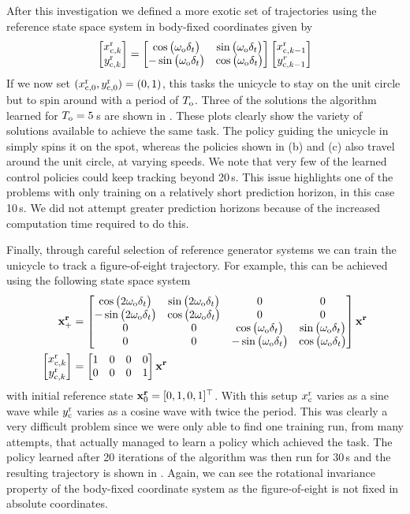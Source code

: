 After this investigation we defined a more exotic set of trajectories using the reference state space system in body-fixed coordinates given by
\begin{equation*}
\begin{bmatrix} x^{\text{r}}_{\text{c},k} \\ y^{\text{r}}_{\text{c},k} \end{bmatrix} = \begin{bmatrix}  \cos\big(\omega_{\text{o}} \delta_t\big) & \sin\big(\omega_{\text{o}} \delta_t\big) \\ -\sin\big(\omega_{\text{o}} \delta_t\big) & \cos\big(\omega_{\text{o}} \delta_t\big)  \end{bmatrix}
\begin{bmatrix} x^{\text{r}}_{\text{c},k-1} \\ y^r_{\text{c},k-1} \end{bmatrix}
\end{equation*}
If we now set $(x^{\text{r}}_{\text{c},0},y^{\text{r}}_{\text{c},0}) = (0,1)$, this tasks the unicycle to stay on the unit circle but to spin around with a period of $T_{\text{o}}$. Three of the solutions the algorithm learned for $T_{\text{o}} = 5\,$s are shown in . These plots clearly show the variety of solutions available to achieve the same task. The policy guiding the unicycle in  simply spins it on the spot, whereas the policies shown in (b) and (c) also travel around the unit circle, at varying speeds. We note that very few of the learned control policies could keep tracking beyond 20$\,$s. This issue highlights one of the problems with only training on a relatively short prediction horizon, in this case 10$\,$s. We did not attempt greater prediction horizons because of the increased computation time required to do this.


Finally, through careful selection of reference generator systems we can train the unicycle to track a figure-of-eight trajectory. For example, this can be achieved using the following state space system
\begin{align*}
\mathbf{x}^{\mathbf{r}}_+ &= \begin{bmatrix}  
\cos\big(2\omega_{\text{o}} \delta_t\big) & \sin\big(2\omega_{\text{o}} \delta_t\big) & 0 & 0 \\ 
-\sin\big(2\omega_{\text{o}} \delta_t\big) & \cos\big(2\omega_{\text{o}} \delta_t\big) & 0 & 0 \\
0 & 0 & \cos\big(\omega_{\text{o}} \delta_t\big) & \sin\big(\omega_{\text{o}} \delta_t\big) \\
0 & 0 & -\sin\big(\omega_{\text{o}} \delta_t\big) & \cos\big(\omega_{\text{o}} \delta_t\big) \end{bmatrix}
\mathbf{x}^{\mathbf{r}} \\
\begin{bmatrix} x^{\text{r}}_{\text{c},k} \\ y^{\text{r}}_{\text{c},k} \end{bmatrix} &= \begin{bmatrix} 1 & 0 & 0 & 0 \\ 0 & 0 & 0 & 1 \end{bmatrix} \mathbf{x}^{\mathbf{r}}
\end{align*}
with initial reference state $\mathbf{x}^{\mathbf{r}}_0 = [0, 1, 0, 1]^\top$. With this setup $x^{\text{r}}_{\text{c}}$ varies as a sine wave while $y^{\text{r}}_{\text{c}}$ varies as a cosine wave with twice the period. This was clearly a very difficult problem since we were only able to find one training run, from many attempts, that actually managed to learn a policy which achieved the task. The policy learned after 20 iterations of the algorithm was then run for 30$\,$s and the resulting trajectory is shown in . Again, we can see the rotational invariance property of the body-fixed coordinate system as the figure-of-eight is not fixed in absolute coordinates. 




